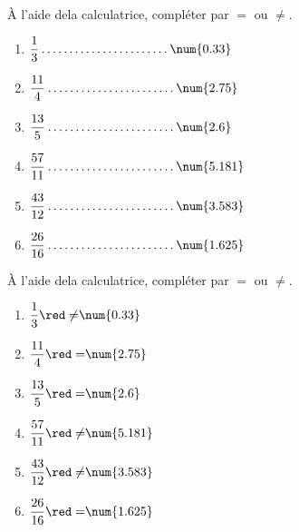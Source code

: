 \begin{exercice*}
    À l'aide dela calculatrice, compléter par $=$ ou $\neq$.
    \begin{multicols}{2}
        \begin{spacing}{1.5}
            \begin{enumerate}
                \item $\dfrac{1}{3}   \makebox[0.3\linewidth]{\dotfill} \num{0.33}$
                \item $\dfrac{11}{4}  \makebox[0.3\linewidth]{\dotfill} \num{2.75}$
                \item $\dfrac{13}{5}  \makebox[0.3\linewidth]{\dotfill} \num{2.6}$
                \item $\dfrac{57}{11} \makebox[0.3\linewidth]{\dotfill} \num{5.181}$
                \item $\dfrac{43}{12} \makebox[0.3\linewidth]{\dotfill} \num{3.583}$
                \item $\dfrac{26}{16} \makebox[0.3\linewidth]{\dotfill} \num{1.625}$
            \end{enumerate}
        \end{spacing}
    \end{multicols}
\end{exercice*}
\begin{corrige}
    À l'aide dela calculatrice, compléter par $=$ ou $\neq$.
    \begin{multicols}{3}
        \begin{spacing}{1.5}
            \begin{enumerate}
                \item $\dfrac{1}{3}   {\red \neq} \num{0.33}$
                \item $\dfrac{11}{4}  {\red =} \num{2.75}$
                \item $\dfrac{13}{5}  {\red =} \num{2.6}$
                \item $\dfrac{57}{11} {\red \neq} \num{5.181}$
                \item $\dfrac{43}{12} {\red \neq} \num{3.583}$
                \item $\dfrac{26}{16} {\red =} \num{1.625}$
            \end{enumerate}
        \end{spacing}
    \end{multicols}

\end{corrige}

